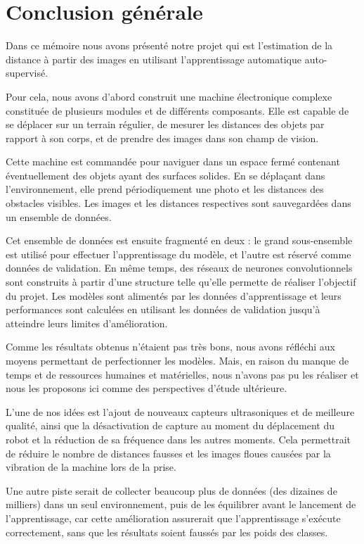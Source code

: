 \chapter*{Conclusion générale}

Dans ce mémoire nous avons présenté notre projet qui est l'estimation de la distance
à partir des images en utilisant l'apprentissage automatique auto-supervisé.

Pour cela, nous avons d'abord construit une machine
électronique complexe constituée de plusieurs modules et de différents composants.
Elle est capable de se déplacer sur un terrain régulier, de mesurer
les distances des objets par rapport à son corps, et de prendre des images dans son
champ de vision.

Cette machine est commandée pour naviguer dans un espace fermé contenant éventuellement
des objets ayant des surfaces solides. En se déplaçant dans l'environnement, elle
prend périodiquement une photo et les distances des obstacles visibles. Les images
et les distances respectives sont sauvegardées dans un ensemble de données.

Cet ensemble de données est ensuite fragmenté en deux : le grand sous-ensemble
est utilisé pour effectuer l'apprentissage du modèle, et l'autre est réservé
comme données de validation. En même temps, des réseaux de neurones convolutionnels
sont construits à partir d'une structure telle qu'elle permette de réaliser l'objectif du projet.
Les modèles sont alimentés par les données d'apprentissage et leurs
performances sont calculées en utilisant les données de validation jusqu'à atteindre
leurs limites d'amélioration.

Comme les résultats obtenus n'étaient pas très bons, nous avons réfléchi aux moyens
permettant de perfectionner les modèles. Mais, en raison du manque de temps et
de ressources humaines et matérielles, nous n'avons pas pu les réaliser et nous
les proposons ici comme des perspectives d'étude ultérieure.

L'une de nos idées est l'ajout de nouveaux capteurs ultrasoniques et de meilleure qualité, ainsi
que la désactivation de capture au moment du déplacement du robot et la réduction de
sa fréquence dans les autres moments. Cela permettrait de réduire le nombre de
distances fausses et les images floues causées par la vibration de la machine lors de la prise.

Une autre piste serait de collecter beaucoup plus de données (des dizaines de milliers)
dans un seul environnement, puis de les équilibrer avant le lancement de l'apprentissage,
car cette amélioration assurerait que l'apprentissage s'exécute correctement, sans que les résultats soient
faussés par les poids des classes.

